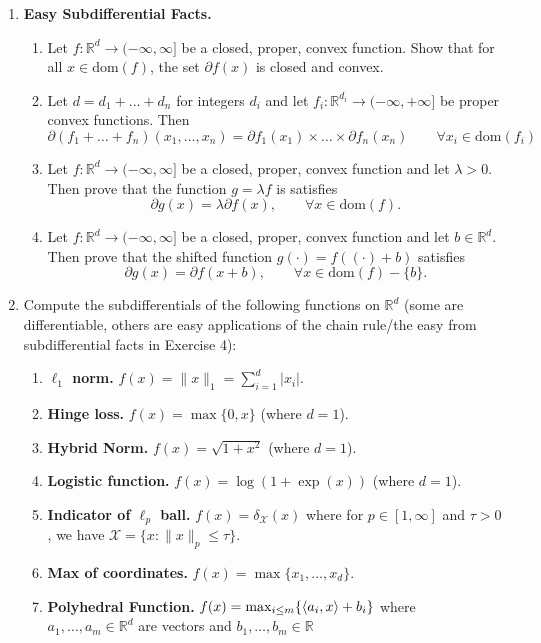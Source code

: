 \documentclass[12pt]{article}
\numberwithin{equation}{section}
\newcommand{\RR}{\mathbb{R}}
\newcommand{\cX}{\mathcal{X}}
\newcommand{\dom}{\mathrm{dom}}
\theoremstyle{remark}
\DeclarePairedDelimiter{\dotp}{\langle}{\rangle}
\begin{document}
\begin{enumerate}
\item {\rm {\bf Easy Subdifferential Facts.} 
\begin{enumerate}
\item Let $f \colon \RR^d \rightarrow (-\infty, \infty]$ be a closed, proper, convex function. Show that for all $x \in \dom(f)$, the set $\partial f(x)$ is closed and convex. 
\item Let $d = d_1 + \ldots + d_n$ for integers $d_i$ and let $f_i \colon \RR^{d_i} \rightarrow (-\infty, +\infty]$ be proper convex functions. Then 
$$
\partial (f_1 +\ldots +  f_n)(x_1, \ldots, x_n) = \partial f_1(x_1) \times \ldots \times  \partial f_n(x_n) \qquad  \forall x_i \in \dom(f_i) 
$$
\item Let $f \colon \RR^d \rightarrow (-\infty, \infty]$ be a closed, proper, convex function and let $\lambda > 0$. Then prove that the function $g = \lambda f$ is satisfies 
$$
\partial g(x) = \lambda \partial f(x), \qquad \forall x \in \dom(f). 
$$
\item  Let $f \colon \RR^d \rightarrow (-\infty, \infty]$ be a closed, proper, convex function and let $b \in \RR^d$. Then prove that the shifted function $g(\cdot) = f((\cdot) +b)$ satisfies
$$
\partial g(x) =  \partial f(x+b), \qquad \forall  x \in \dom(f) - \{b\}. 
$$
\end{enumerate}
}
\item {\rm Compute the subdifferentials of the following functions on $\RR^d$ (some are differentiable, others are easy applications of the chain rule/the easy from subdifferential facts in Exercise 4):
\begin{enumerate}[noitemsep]
\item {\bf $\ell_1$ norm.} $f(x) = \|x\|_1 = \sum_{i=1}^d |x_i|$.
\item {\bf Hinge loss.} $f(x) = \max\{0, x\}$ (where $d=1$). 
\item {\bf Hybrid Norm.} $f(x) = \sqrt{1+x^2}$ (where $d=1$).
\item {\bf Logistic function.} $f(x) = \log(1 +\exp(x))$ (where $d=1$).%
\item {\bf Indicator of $\ell_p$ ball.} \Coffeecup $f(x) = \delta_{\cX}(x)$ where for $p \in [1, \infty]$ and $\tau > 0$, we have $\cX = \{x \colon \|x\|_p \leq \tau\}$.
\item {\bf Max of coordinates.} \Coffeecup$f(x) = \max \{x_1, \ldots, x_d\}$.
\item {\bf Polyhedral Function.} $f(x) = \max_{i \leq m}\{ \dotp{a_i, x} + b_i\}$ where $a_1, \ldots, a_m \in \RR^d$ are vectors and $b_1, \ldots, b_m \in \RR$

\end{enumerate}}
\end{enumerate}
\end{document}

